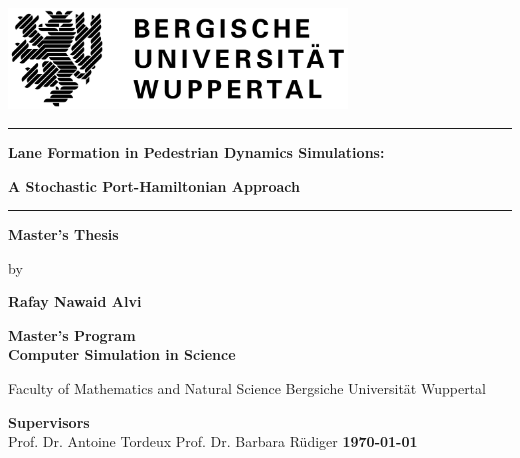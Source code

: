 \begin{titlepage}
    \begin{center}
        \includegraphics[width=90mm]{BUW_Logo.svg.png}

        \vspace*{0.5cm}
        \rule{\textwidth}{2pt}
        \LARGE
        \textbf{Lane Formation in Pedestrian Dynamics Simulations:}

        \textbf{A Stochastic Port-Hamiltonian Approach}
        \rule{\textwidth}{2pt}

        \vspace{0.5cm}
        \LARGE
        \textbf{Master's Thesis}

        \vspace{0.1cm}
        \large
        by

        \huge
        \textbf{Rafay Nawaid Alvi}
        \vfill

        \LARGE
        \textbf{Master's Program}\\
        \vspace{0.2cm}
        \Large
        \textbf{Computer Simulation in Science}

        \vspace{0.5cm}
        \Large
        Faculty of Mathematics and Natural Science \linebreak Bergsiche Universität Wuppertal

        \vspace{1cm}
        \textbf{Supervisors}\\
        \Large
        Prof. Dr. Antoine Tordeux \hfill Prof. Dr. Barbara Rüdiger
        \vfill
        \large
        \textbf{\today}
    \end{center}
\end{titlepage}